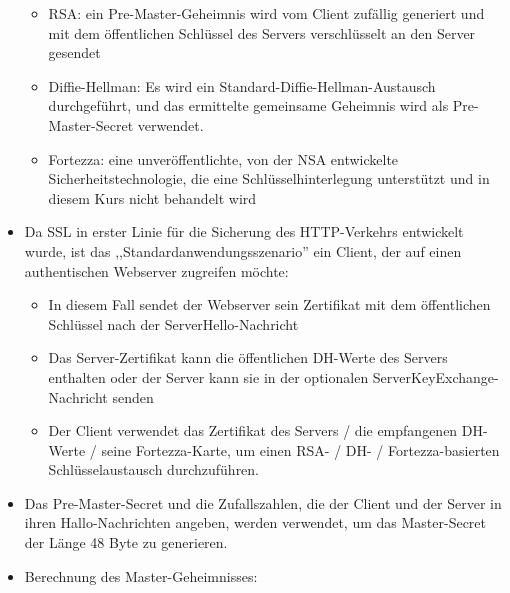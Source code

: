 \documentclass[a4paper]{article}
\begin{document}
\begin{multicols}{3}
\begin{itemize}
              \begin{itemize}
                  \item
                        RSA: ein Pre-Master-Geheimnis wird vom Client zufällig generiert und
                        mit dem öffentlichen Schlüssel des Servers verschlüsselt an den
                        Server gesendet
                  \item
                        Diffie-Hellman: Es wird ein Standard-Diffie-Hellman-Austausch
                        durchgeführt, und das ermittelte gemeinsame Geheimnis wird als
                        Pre-Master-Secret verwendet.
                  \item
                        Fortezza: eine unveröffentlichte, von der NSA entwickelte
                        Sicherheitstechnologie, die eine Schlüsselhinterlegung unterstützt
                        und in diesem Kurs nicht behandelt wird
              \end{itemize}
        \item
              Da SSL in erster Linie für die Sicherung des HTTP-Verkehrs entwickelt
              wurde, ist das ,,Standardanwendungsszenario'' ein Client, der auf
              einen authentischen Webserver zugreifen möchte:

              \begin{itemize}
                  \item
                        In diesem Fall sendet der Webserver sein Zertifikat mit dem
                        öffentlichen Schlüssel nach der ServerHello-Nachricht
                  \item
                        Das Server-Zertifikat kann die öffentlichen DH-Werte des Servers
                        enthalten oder der Server kann sie in der optionalen
                        ServerKeyExchange-Nachricht senden
                  \item
                        Der Client verwendet das Zertifikat des Servers / die empfangenen
                        DH-Werte / seine Fortezza-Karte, um einen RSA- / DH- /
                        Fortezza-basierten Schlüsselaustausch durchzuführen.
              \end{itemize}
        \item
              Das Pre-Master-Secret und die Zufallszahlen, die der Client und der
              Server in ihren Hallo-Nachrichten angeben, werden verwendet, um das
              Master-Secret der Länge 48 Byte zu generieren.
        \item
              Berechnung des Master-Geheimnisses:


\end{itemize}
\end{multicols}
\end{document}
